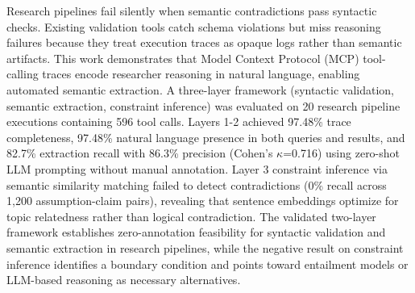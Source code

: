 
Research pipelines fail silently when semantic contradictions pass syntactic checks. Existing validation tools catch schema violations but miss reasoning failures because they treat execution traces as opaque logs rather than semantic artifacts. This work demonstrates that Model Context Protocol (MCP) tool-calling traces encode researcher reasoning in natural language, enabling automated semantic extraction. A three-layer framework (syntactic validation, semantic extraction, constraint inference) was evaluated on 20 research pipeline executions containing 596 tool calls. Layers 1-2 achieved 97.48\% trace completeness, 97.48\% natural language presence in both queries and results, and 82.7\% extraction recall with 86.3\% precision (Cohen's $\kappa$=0.716) using zero-shot LLM prompting without manual annotation. Layer 3 constraint inference via semantic similarity matching failed to detect contradictions (0\% recall across 1,200 assumption-claim pairs), revealing that sentence embeddings optimize for topic relatedness rather than logical contradiction. The validated two-layer framework establishes zero-annotation feasibility for syntactic validation and semantic extraction in research pipelines, while the negative result on constraint inference identifies a boundary condition and points toward entailment models or LLM-based reasoning as necessary alternatives.
